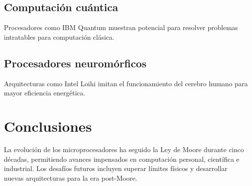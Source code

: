\documentclass[]{article}
\begin{document}
\subsection{Computación cuántica}
Procesadores como IBM Quantum muestran potencial para resolver problemas intratables para computación clásica\cite{Steve_Jobs}.

\subsection{Procesadores neuromórficos}
Arquitecturas como Intel Loihi imitan el funcionamiento del cerebro humano para mayor eficiencia energética.

\section{Conclusiones}
La evolución de los microprocesadores ha seguido la Ley de Moore durante cinco décadas, permitiendo avances impensados en computación personal, científica e industrial. Los desafíos futuros incluyen superar límites físicos y desarrollar nuevas arquitecturas para la era post-Moore.



\end{document}
